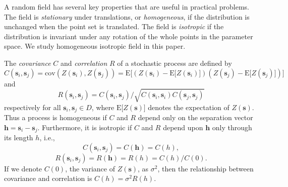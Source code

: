 \documentclass[referee]{ieice}
\begin{document}
A random field has several key properties that are useful in practical problems. The field is {\it stationary} under
translations, or {\it homogeneous}, if the distribution is unchanged when the point set is translated. The field is
{\it isotropic} if the distribution is invariant under any rotation of the whole points in the parameter space.
We study homogeneous isotropic field in this paper.

The {\it covariance} $C$ and {\it correlation} $R$ of a stochastic process are defined by
\begin{equation}
C(\mathbf{s}_i,\mathbf{s}_j) = \mathrm{cov}(Z(\mathbf{s}_i),Z(\mathbf{s}_j)) = \mathrm{E}\lbrack (Z(\mathbf{s}_i)-\mathrm{E}\lbrack Z(\mathbf{s}_i)\rbrack)(Z(\mathbf{s}_j)-\mathrm{E}\lbrack Z(\mathbf{s}_j)\rbrack)\rbrack \nonumber
\end{equation}
and
\begin{equation}
R(\mathbf{s}_i,\mathbf{s}_j)=C(\mathbf{s}_i,\mathbf{s}_j)/ \sqrt{C(\mathbf{s}_i,\mathbf{s}_i)C(\mathbf{s}_j,\mathbf{s}_j)}
\end{equation}
respectively for all $\mathbf{s}_i,\mathbf{s}_j\in D$, where $\mathrm{E}\lbrack Z(\mathbf{s})\rbrack$
denotes the expectation of $Z(\mathbf{s})$. Thus a process is homogeneous if $C$ and $R$ depend
only on the separation vector
$\mathbf{h}=\mathbf{s}_i-\mathbf{s}_j$. %
Furthermore, it is isotropic if $C$ and $R$ depend upon $\mathbf{h}$ only through its length $h$, i.e.,
\begin{equation}
C(\mathbf{s}_i,\mathbf{s}_j)=C(\mathbf{h})=C(h),
\end{equation}
\begin{equation} \label{eqn:corr_def}
R(\mathbf{s}_i,\mathbf{s}_j)=R(\mathbf{h})=R(h)=C(h)/C(0).
\end{equation}
If we denote $C(0)$, the variance of $Z(\mathbf{s})$, as $\sigma^2$, then the relationship between
covariance and correlation is $C(h)=\sigma^2 R(h)$.
\end{document}
